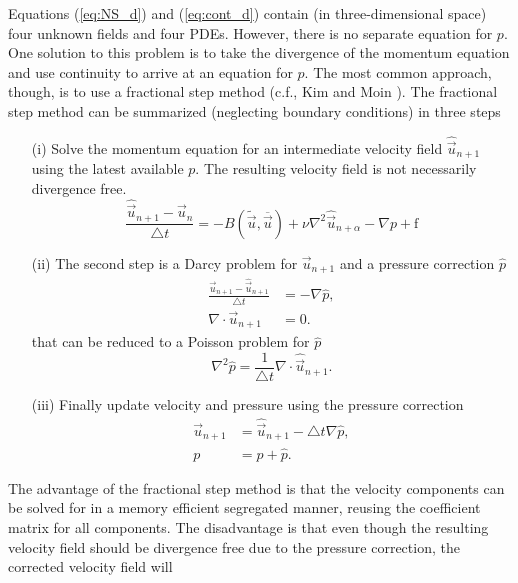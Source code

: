 Equations (\ref{eq:NS_d}) and (\ref{eq:cont_d}) contain (in
three-dimensional space) four unknown fields and four PDEs. However,
there is no separate equation for $p$. One solution to this problem is
to take the divergence of the momentum equation and use continuity to
arrive at an equation for $p$. The most common approach, though, is to
use a fractional step method (c.f., Kim and Moin \cite{kim85}). The
fractional step method can be summarized (neglecting boundary
conditions) in three steps
\begin{itemize}
 \item[(i)] Solve the momentum equation for an intermediate velocity field $\hat{\vec{u}}_{n+1}$ using the latest available $p$. The resulting velocity field is not necessarily divergence free.\\
\begin{equation}
\label{eq:NS_FS} \frac{\hat{\vec{u}}_{n+1}-\vec{u}_{n}}{\triangle t} = - B(\tilde{\vec{u}},\overline{\vec{u}}) + \nu \nabla^2 \hat{\vec{u}}_{n+\alpha} -\nabla p + \text{f}
\end{equation}
 \item[(ii)] The second step is a Darcy problem for $\vec{u}_{n+1}$ and a pressure correction $\hat{p}$
\begin{align}
 \label{eq:vel_Darcy} \frac{\vec{u}_{n+1} - \hat{\vec{u}}_{n+1}}{\triangle t} &=  - \nabla \hat{p}, \\
  \nabla \cdot \vec{u}_{n+1} &= 0.
\label{eq:update}
\end{align}
that can be reduced to a Poisson problem for $\hat{p}$
\begin{equation}
 \label{eq:PC} \nabla^2 \hat{p} = \frac{1}{\triangle t} \nabla \cdot \hat{\vec{u}}_{n+1}.
\end{equation}
 \item[(iii)] Finally update velocity and pressure using the pressure correction
\begin{align}
 \label{eq:vel_update} \vec{u}_{n+1} &= \hat{\vec{u}}_{n+1} - \triangle t \nabla \hat{p}, \\
  p &= p + \hat{p}.
\label{eq:update}
\end{align}
\end{itemize}
The advantage of the fractional step method is that the velocity
components can be solved for in a memory efficient segregated manner,
reusing the coefficient matrix for all components. The disadvantage is
that even though the resulting velocity field should be divergence
free due to the pressure correction, the corrected velocity field will
